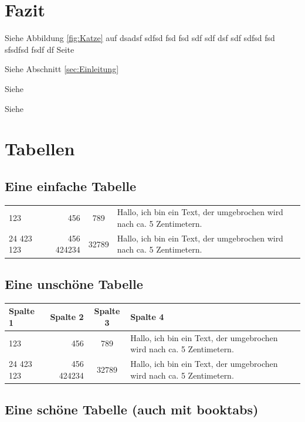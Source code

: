\documentclass[12pt,ngerman,parskip=half]{scrartcl}
\begin{document}
\blindtext

\blindtext[10]

\section{Fazit}

\blindtext[10]

Siehe Abbildung \ref{fig:Katze} auf dsadsf sdfsd fsd fsd sdf sdf dsf sdf sdfsd fsd sfsdfsd fsdf df  Seite~\pageref{fig:Katze}

Siehe Abschnitt \ref{sec:Einleitung}

Siehe 

Siehe 

\section{Tabellen}
\subsection{Eine einfache Tabelle}
\begin{tabular}{lrcp{5cm}}
123 & 456 & 789  & Hallo, ich bin ein Text, der umgebrochen wird nach ca. 5 Zentimetern. \\
24 423 123 & 456 424234 &  32789  & Hallo, ich bin ein Text, der umgebrochen wird nach ca. 5 Zentimetern. \\
\end{tabular}

\subsection{Eine unschöne Tabelle}

\begin{tabular}{|l|r|c|p{5cm}|} \hline
Spalte 1 & Spalte 2  & Spalte 3 & Spalte 4 \\ \hline
123 & 456 & 789  & Hallo, ich bin ein Text, der umgebrochen wird nach ca. 5 Zentimetern. \\ \hline
24 423 123 & 456 424234 &  32789  & Hallo, ich bin ein Text, der umgebrochen wird nach ca. 5 Zentimetern. \\ \hline
\end{tabular} 

\blindtext

\subsection{Eine schöne Tabelle (auch mit booktabs)}
\end{document}
